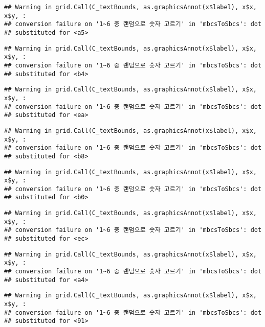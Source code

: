 \documentclass[]{book}
\begin{document}
\begin{verbatim}
## Warning in grid.Call(C_textBounds, as.graphicsAnnot(x$label), x$x, x$y, :
## conversion failure on '1~6 중 랜덤으로 숫자 고르기' in 'mbcsToSbcs': dot
## substituted for <a5>
\end{verbatim}

\begin{verbatim}
## Warning in grid.Call(C_textBounds, as.graphicsAnnot(x$label), x$x, x$y, :
## conversion failure on '1~6 중 랜덤으로 숫자 고르기' in 'mbcsToSbcs': dot
## substituted for <b4>
\end{verbatim}

\begin{verbatim}
## Warning in grid.Call(C_textBounds, as.graphicsAnnot(x$label), x$x, x$y, :
## conversion failure on '1~6 중 랜덤으로 숫자 고르기' in 'mbcsToSbcs': dot
## substituted for <ea>
\end{verbatim}

\begin{verbatim}
## Warning in grid.Call(C_textBounds, as.graphicsAnnot(x$label), x$x, x$y, :
## conversion failure on '1~6 중 랜덤으로 숫자 고르기' in 'mbcsToSbcs': dot
## substituted for <b8>
\end{verbatim}

\begin{verbatim}
## Warning in grid.Call(C_textBounds, as.graphicsAnnot(x$label), x$x, x$y, :
## conversion failure on '1~6 중 랜덤으로 숫자 고르기' in 'mbcsToSbcs': dot
## substituted for <b0>
\end{verbatim}

\begin{verbatim}
## Warning in grid.Call(C_textBounds, as.graphicsAnnot(x$label), x$x, x$y, :
## conversion failure on '1~6 중 랜덤으로 숫자 고르기' in 'mbcsToSbcs': dot
## substituted for <ec>
\end{verbatim}

\begin{verbatim}
## Warning in grid.Call(C_textBounds, as.graphicsAnnot(x$label), x$x, x$y, :
## conversion failure on '1~6 중 랜덤으로 숫자 고르기' in 'mbcsToSbcs': dot
## substituted for <a4>
\end{verbatim}

\begin{verbatim}
## Warning in grid.Call(C_textBounds, as.graphicsAnnot(x$label), x$x, x$y, :
## conversion failure on '1~6 중 랜덤으로 숫자 고르기' in 'mbcsToSbcs': dot
## substituted for <91>
\end{verbatim}
\end{document}
